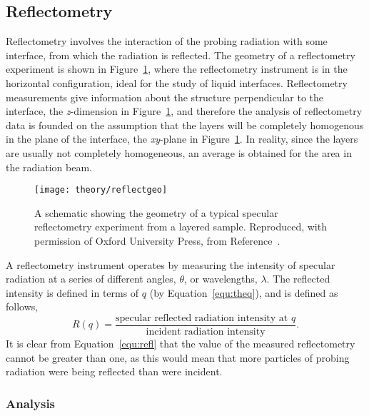\subsection{Reflectometry}
\label{sec:refltheory}

Reflectometry involves the interaction of the probing radiation with some interface, from which the radiation is reflected.
The geometry of a reflectometry experiment is shown in Figure~\ref{fig:refgeo}, where the reflectometry instrument is in the horizontal configuration, ideal for the study of liquid interfaces.
Reflectometry measurements give information about the structure perpendicular to the interface, the \emph{z}-dimension in Figure~\ref{fig:refgeo}, and therefore the analysis of reflectometry data is founded on the assumption that the layers will be completely homogenous in the plane of the interface, the \emph{xy}-plane in Figure~\ref{fig:refgeo}.
In reality, since the layers are usually not completely homogeneous, an average is obtained for the area in the radiation beam.
%
\begin{figure}
    \centering
    \texttt{[image: theory/reflectgeo]}
    \caption{A schematic showing the geometry of a typical specular reflectometry experiment from a layered sample. Reproduced, with permission of Oxford University Press\textsuperscript{\textcopyright}, from Reference~\cite{sivia_elementary_2011}.}
    \label{fig:refgeo}
\end{figure}
%
A reflectometry instrument operates by measuring the intensity of specular radiation at a series of different angles, $\theta$, or wavelengths, $\lambda$.
The reflected intensity is defined in terms of $q$ (by Equation~\ref{equ:theq}), and is defined as follows,
%
\begin{equation}
    R(q) = \frac{\text{specular reflected radiation intensity at }q}{\text{incident radiation intensity}}.
    \label{equ:refl}
\end{equation}
%
It is clear from Equation~\ref{equ:refl} that the value of the measured reflectometry cannot be greater than one, as this would mean that more particles of probing radiation were being reflected than were incident.

\subsubsection{Analysis}

